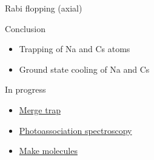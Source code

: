 \documentclass{beamer}
\begin{document}
\begin{frame}{Rabi flopping (axial)}
  \begin{center}
  \end{center}
\end{frame}

\begin{frame}{}
  \hypertarget{conclusion}{}
  \begin{block}{Conclusion}
    \begin{itemize}
    \item Trapping of Na and Cs atoms
    \item Ground state cooling of Na and Cs
    \end{itemize}
  \end{block}
  \begin{block}{In progress}
    \begin{itemize}
    \item \hyperlink{merge-trap-plan}{Merge trap}
    \item \hyperlink{backup-associate}{Photoassociation spectroscopy}
    \item \hyperlink{backup-associate}{Make molecules}
    \end{itemize}
  \end{block}
\end{frame}
\end{document}
